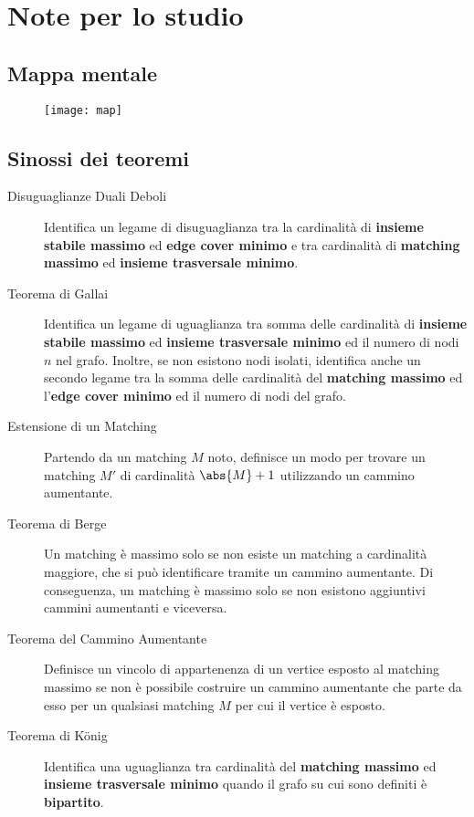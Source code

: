 \documentclass[\main/main.tex]{subfiles}
\begin{document}

\chapter{Note per lo studio}
\section{Mappa mentale}
\begin{figure}
	\texttt{[image: map]}
\end{figure}
\clearpage
\section{Sinossi dei teoremi}
\begin{multicols}{2}
	\begin{description}
		\item[Disuguaglianze Duali Deboli] Identifica un legame di disuguaglianza tra la cardinalità di \textbf{insieme stabile massimo} ed \textbf{edge cover minimo} e tra cardinalità di \textbf{matching massimo} ed \textbf{insieme trasversale minimo}.
		\item[Teorema di Gallai] Identifica un legame di uguaglianza tra somma delle cardinalità di \textbf{insieme stabile massimo} ed \textbf{insieme trasversale minimo} ed il numero di nodi \(n\) nel grafo. Inoltre, se non esistono nodi isolati, identifica anche un secondo legame tra la somma delle cardinalità del \textbf{matching massimo} ed l'\textbf{edge cover minimo} ed il numero di nodi del grafo.
		\item[Estensione di un Matching] Partendo da un matching \(M\) noto, definisce un modo per trovare un matching \(M'\) di cardinalità \(\abs{M}+1\) utilizzando un cammino aumentante.
		\item[Teorema di Berge] Un matching è massimo solo se non esiste un matching a cardinalità maggiore, che si può identificare tramite un cammino aumentante. Di conseguenza, un matching è massimo solo se non esistono aggiuntivi cammini aumentanti e viceversa.
		\item[Teorema del Cammino Aumentante] Definisce un vincolo di appartenenza di un vertice esposto al matching massimo se non è possibile costruire un cammino aumentante che parte da esso per un qualsiasi matching \(M\) per cui il vertice è esposto.
		\item[Teorema di König] Identifica una uguaglianza tra cardinalità del \textbf{matching massimo} ed \textbf{insieme trasversale minimo} quando il grafo su cui sono definiti è \textbf{bipartito}.

\end{description}
\end{multicols}
\end{document}

